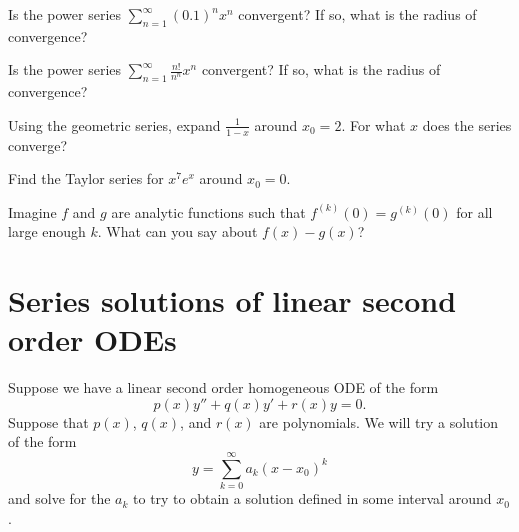 \setcounter{exercise}{100}

\begin{exercise}
Is the power series
$\displaystyle \sum_{n=1}^\infty {(0.1)}^n x^n$
convergent? If so, what is the radius of convergence?
\end{exercise}

\begin{exercise}[challenging]
Is the power series
$\displaystyle \sum_{n=1}^\infty \frac{n!}{n^n} x^n$
convergent? If so, what is the radius of convergence?
\end{exercise}

\begin{exercise}
Using the geometric series, expand $\frac{1}{1-x}$ around $x_0=2$.
For what $x$ does the series converge?
\end{exercise}

\begin{exercise}[challenging]
Find the Taylor series for $x^7 e^x$ around $x_0 = 0$.
\end{exercise}

\begin{exercise}[challenging]
Imagine $f$ and $g$ are analytic functions such that
$f^{(k)}(0) = g^{(k)}(0)$ for all large enough $k$.  What can you
say about $f(x)-g(x)$?
\end{exercise}


\sectionnewpage
\section{Series solutions of linear second order ODEs}
\label{seriessols:section}


Suppose we have a linear second order homogeneous ODE of the form
\begin{equation*}
p(x) y'' + q(x) y' + r(x) y = 0 .
\end{equation*}
Suppose that $p(x)$, $q(x)$, and $r(x)$ are polynomials.  We will 
try a solution of the form
\begin{equation*}
y = \sum_{k=0}^\infty a_k {(x-x_0)}^k
\end{equation*}
and solve for the $a_k$ to try to obtain a solution defined in some
interval around $x_0$.

